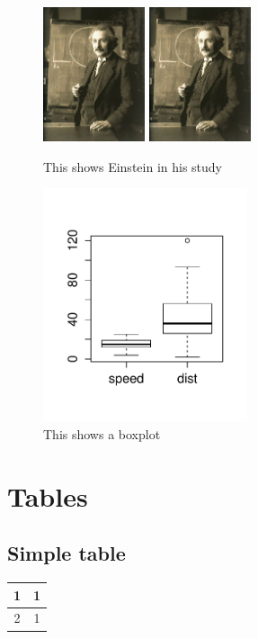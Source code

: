 \documentclass{article}
\begin{document}
\begin{figure}
\centering
\includegraphics[width=3cm]{einstein}
\includegraphics[width=3cm]{einstein}
\caption{This shows Einstein in his study}\label{fig: einstein2}
\end{figure}  



\begin{figure}
\centering
\includegraphics[width=6cm]{boxplot} %
\caption{This shows a boxplot}\label{fig: boxplot}
\end{figure} 

\section{Tables}

\subsection{Simple table}
\begin{tabular}{|c|c|}
\hline 
1 & 1 \\ 
\hline 
2 & 1 \\ 
\hline 
\end{tabular} 
\end{document}
